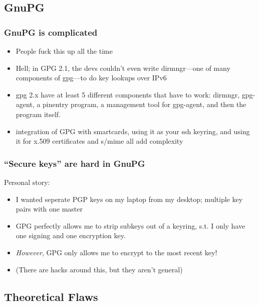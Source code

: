 \documentclass[aspectratio=1610,bigger,utf8]{beamer}
\begin{document}


\subsection{GnuPG}

\begin{frame}
	\frametitle{GnuPG is complicated}
	\begin{itemize}
		\item People fuck this up all the time
		\item Hell; in GPG 2.1, the devs couldn't even write
			dirmngr---one of many components of gpg---to do key
			lookups over IPv6
		\item gpg 2.x have at least 5 different components that have to
			work: dirmngr, gpg-agent, a pinentry program, a
			management tool for gpg-agent, and then the program
			itself.
		\item integration of GPG with smartcards, using it as your ssh
			keyring, and using it for x.509 certificates and s/mime
			all add complexity
	\end{itemize}
\end{frame}
\begin{frame}
	\frametitle{``Secure keys'' are hard in GnuPG}
	Personal story:
	\begin{itemize}
		\item I wanted seperate PGP keys on my laptop from my desktop;
			multiple key pairs with one master
		\item GPG perfectly allows me to strip subkeys out of a
			keyring, s.t. I only have one signing and one
			encryption key.
		\item \emph{However}, GPG only allows me to encrypt to the
			\alert{most recent} key!
		\item (There are hacks around this, but they aren't general)
	\end{itemize}
\end{frame}

\subsection{Theoretical Flaws}
\end{document}
